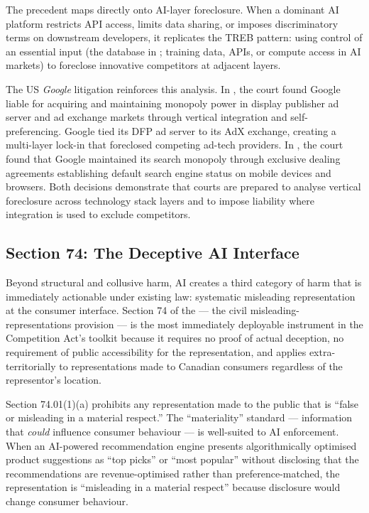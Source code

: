 The  precedent maps directly onto AI-layer foreclosure. When a dominant AI platform restricts API access, limits data sharing, or imposes discriminatory terms on downstream developers, it replicates the TREB pattern: using control of an essential input (the database in ; training data, APIs, or compute access in AI markets) to foreclose innovative competitors at adjacent layers.

The US \textit{Google} litigation reinforces this analysis. In , the court found Google liable for acquiring and maintaining monopoly power in display publisher ad server and ad exchange markets through vertical integration and self-preferencing. Google tied its DFP ad server to its AdX exchange, creating a multi-layer lock-in that foreclosed competing ad-tech providers. In , the court found that Google maintained its search monopoly through exclusive dealing agreements establishing default search engine status on mobile devices and browsers. Both decisions demonstrate that courts are prepared to analyse vertical foreclosure across technology stack layers and to impose liability where integration is used to exclude competitors.

\subsection{Section 74: The Deceptive AI Interface}

Beyond structural and collusive harm, AI creates a third category of harm that is immediately actionable under existing law: systematic misleading representation at the consumer interface. Section 74 of the  --- the civil misleading-representations provision --- is the most immediately deployable instrument in the Competition Act's toolkit because it requires no proof of actual deception, no requirement of public accessibility for the representation, and applies extra-territorially to representations made to Canadian consumers regardless of the representor's location.

Section 74.01(1)(a) prohibits any representation made to the public that is ``false or misleading in a material respect.'' The ``materiality'' standard --- information that \textit{could} influence consumer behaviour --- is well-suited to AI enforcement. When an AI-powered recommendation engine presents algorithmically optimised product suggestions as ``top picks'' or ``most popular'' without disclosing that the recommendations are revenue-optimised rather than preference-matched, the representation is ``misleading in a material respect'' because disclosure would change consumer behaviour.

